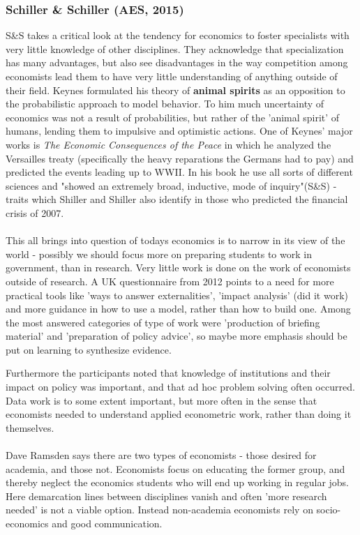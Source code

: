 \documentclass[12pt, a4paper]{article}
\begin{document}
\begin{multicols}{2}
\subsubsection{Schiller \& Schiller (AES, 2015)}
S\&S takes a critical look at the tendency for economics to foster specialists with very little knowledge of other disciplines. They acknowledge that specialization has many advantages, but also see disadvantages in the way competition among economists lead them to have very little understanding of anything outside of their field. Keynes formulated his theory of \textbf{animal spirits} as an opposition to the probabilistic approach to model behavior. To him much uncertainty of economics was not a result of probabilities, but rather of the 'animal spirit' of humans, lending them to impulsive and optimistic actions. One of Keynes' major works is \textit{The Economic Consequences of the Peace} in which he analyzed the Versailles treaty (specifically the heavy reparations the Germans had to pay) and predicted the events leading up to WWII. In his book he use all sorts of different sciences and "showed an extremely broad, inductive, mode of inquiry"(S\&S) - traits which Shiller and Shiller also identify in those who predicted the financial crisis of 2007. 
\\ \\
This all brings into question of todays economics is to narrow in its view of the world - possibly we should focus more on preparing students to work in government, than in research. Very little work is done on the work of economists outside of research. A UK questionnaire from 2012 points to a need for more practical tools like 'ways to answer externalities', 'impact analysis' (did it work) and more guidance in how to use a model, rather than how to build one. Among the most answered categories of type of work were 'production of briefing material' and 'preparation of policy advice', so maybe more emphasis should be put on learning to synthesize evidence. 

Furthermore the participants noted that knowledge of institutions and their impact on policy was important, and that ad hoc problem solving often occurred. Data work is to some extent important, but more often in the sense that economists needed to understand applied econometric work, rather than doing it themselves. 
\\ \\
Dave Ramsden says there are two types of economists - those desired for academia, and those not. Economists focus on educating the former group, and thereby neglect the economics students who will end up working in regular jobs. Here demarcation lines between disciplines vanish and often 'more research needed' is not a viable option. Instead non-academia economists rely on socio-economics and good communication.

\end{multicols}
\end{document}
